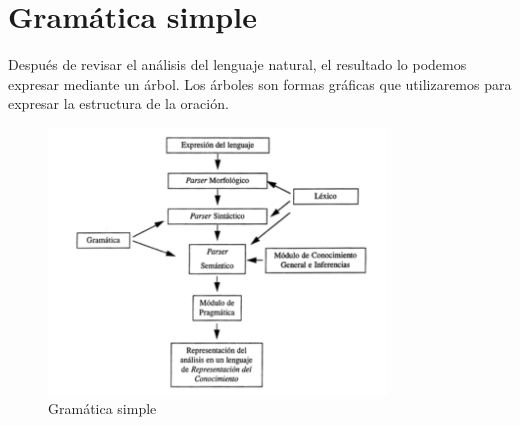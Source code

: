 \section{Gram\'atica simple}

Despu\'es de revisar el an\'alisis del lenguaje natural, el resultado lo podemos expresar mediante un \'arbol. Los \'arboles son formas gr\'aficas que utilizaremos para expresar la estructura de la oraci\'on. \cite{elprofesionaldelainformacion}

	\begin{figure}[htbp!]
		\centering
			\includegraphics[width=0.8\textwidth]{images/gramatica}
		\caption{Gram\'atica simple}
	\end{figure}
	